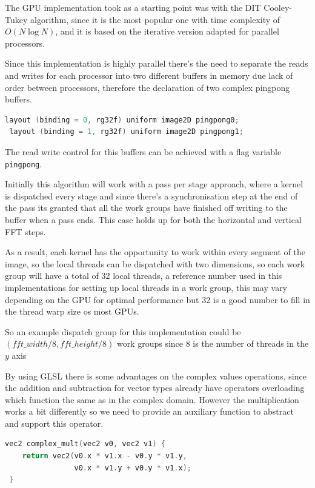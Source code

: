 \documentclass[
  oneside,
  11pt, a4paper,
  footinclude=true,
  headinclude=true,
  cleardoublepage=empty
]{scrbook}
\begin{document}

The GPU implementation took as a starting point was with the DIT Cooley-Tukey algorithm, since it is the most popular one with time complexity of $O(N\log{N})$, and it is based on the iterative version adapted for parallel processors.

Since this implementation is highly parallel there's the need to separate the reads and writes for each processor into two different buffers in memory due lack of order between processors, therefore the declaration of two complex pingpong buffers.

\begin{lstlisting}[language=C]
 layout (binding = 0, rg32f) uniform image2D pingpong0;
 layout (binding = 1, rg32f) uniform image2D pingpong1;
\end{lstlisting}

The read write control for this buffers can be achieved with a flag variable \texttt{pingpong}.

Initially this algorithm will work with a pass per stage approach, where a kernel is dispatched every stage and since there's a synchronisation step at the end of the pass its granted that all the work groups have finished off writing to the buffer when a pass ends. This case holds up for both the horizontal and vertical FFT steps.

As a result, each kernel has the opportunity to work within every segment of the image, so the local threads can be dispatched with two dimensions, so each work group will have a total of 32 local threads, a reference number used in this implementations for setting up local threads in a work group, this may vary depending on the GPU for optimal performance but 32 is a good number to fill in the thread warp size os most GPUs.

So an example dispatch group for this implementation could be $(fft\_width/8,fft\_height/8)$ work groups since 8 is the number of threads in the $y$ axis

By using GLSL there is some advantages on the complex values operations, since the addition and subtraction for vector types already have operators overloading which function the same as in the complex domain. However the multiplication works a bit differently so we need to provide an auxiliary function to abstract and support this operator.

\begin{lstlisting}[language=C,caption=Complex multiplication]
 vec2 complex_mult(vec2 v0, vec2 v1) {
 	return vec2(v0.x * v1.x - v0.y * v1.y,
 				v0.x * v1.y + v0.y * v1.x);
 }
\end{lstlisting}
\end{document}
